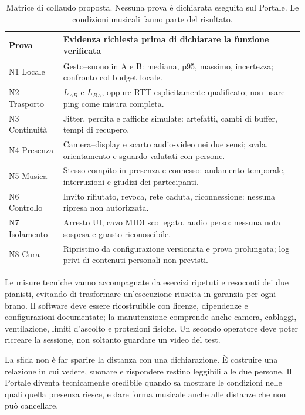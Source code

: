 \begin{table}[htbp]
\centering\small
\begin{tabularx}{\linewidth}{@{}lX@{}}
\toprule
Prova & Evidenza richiesta prima di dichiarare la funzione verificata \\
\midrule
N1 Locale & Gesto--suono in A e B: mediana, p95, massimo, incertezza; confronto col budget locale. \\
N2 Trasporto & $L_{AB}$ e $L_{BA}$, oppure RTT esplicitamente qualificato; non usare ping come misura completa. \\
N3 Continuità & Jitter, perdita e raffiche simulate: artefatti, cambi di buffer, tempi di recupero. \\
N4 Presenza & Camera--display e scarto audio-video nei due sensi; scala, orientamento e sguardo valutati con persone. \\
N5 Musica & Stesso compito in presenza e connesso: andamento temporale, interruzioni e giudizi dei partecipanti. \\
N6 Controllo & Invito rifiutato, revoca, rete caduta, riconnessione: nessuna ripresa non autorizzata. \\
N7 Isolamento & Arresto UI, cavo MIDI scollegato, audio perso: nessuna nota sospesa e guasto riconoscibile. \\
N8 Cura & Ripristino da configurazione versionata e prova prolungata; log privi di contenuti personali non previsti. \\
\bottomrule
\end{tabularx}
\caption{Matrice di collaudo proposta. Nessuna prova è dichiarata
eseguita sul Portale. Le condizioni musicali fanno parte del risultato.}
\end{table}

Le misure tecniche vanno accompagnate da esercizi ripetuti e
resoconti dei due pianisti, evitando di trasformare un'esecuzione
riuscita in garanzia per ogni brano. Il software deve essere
ricostruibile con licenze, dipendenze e configurazioni documentate;
la manutenzione comprende anche camera, cablaggi, ventilazione,
limiti d'ascolto e protezioni fisiche. Un secondo operatore deve
poter ricreare la sessione, non soltanto guardare un video del test.

La sfida non è far sparire la distanza con una dichiarazione.
È costruire una relazione in cui vedere, suonare e rispondere
restino leggibili alle due persone. Il Portale diventa tecnicamente
credibile quando sa mostrare le condizioni nelle quali quella
presenza riesce, e dare forma musicale anche alle distanze che
non può cancellare.

